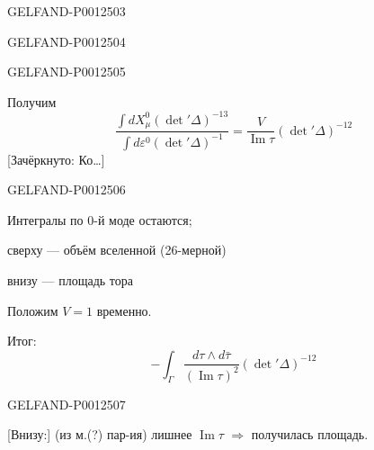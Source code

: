 \begin{GelfandAdjacentEvidence}{GELFAND-P001250}{3}

\end{GelfandAdjacentEvidence}
\begin{GelfandAdjacentEvidence}{GELFAND-P001250}{4}

\end{GelfandAdjacentEvidence}
\begin{GelfandAdjacentEvidence}{GELFAND-P001250}{5}

Получим
\begin{equation*}
\frac{\int dX_{\mu}^0(\det'\Delta)^{-13}}
{\int d\varepsilon^0(\det'\Delta)^{-1}}
=\frac{V}{\operatorname{Im}\tau}(\det'\Delta)^{-12}\tag{16}
\end{equation*}
[Зачёркнуто: Ко…]
\end{GelfandAdjacentEvidence}
\begin{GelfandAdjacentEvidence}{GELFAND-P001250}{6}

Интегралы по 0-й моде остаются;

сверху — объём вселенной (26-мерной)

внизу — площадь тора

Положим $V=1$ временно.

Итог:
\begin{equation*}
-\int_{\Gamma}
\frac{d\tau\wedge d\bar\tau}
{(\operatorname{Im}\tau)^2}(\det'\Delta)^{-12}\tag{17}
\end{equation*}
\end{GelfandAdjacentEvidence}
\begin{GelfandAdjacentEvidence}{GELFAND-P001250}{7}

[Внизу:] (из м.(?) пар-ия) лишнее $\operatorname{Im}\tau$ $\Longrightarrow$ получилась площадь.
\end{GelfandAdjacentEvidence}



